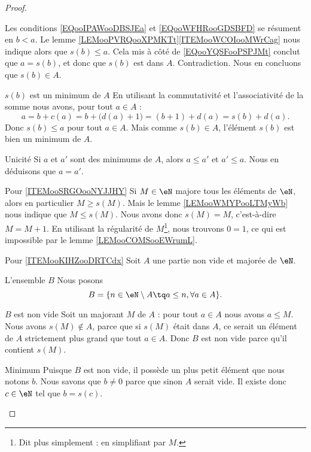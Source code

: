 \begin{proof}
\begin{subproof}
\begin{subproof}
			Les conditions \eqref{EQooIPAWooDBSJEa} et \eqref{EQooWFHRooGDSBFD} se résument en \( b<a\). Le lemme \ref{LEMooPVRQooXPMKTt}\ref{ITEMooWCOIooMWrCag} nous indique alors que \( s(b)\leq a\). Cela mis à côté de \eqref{EQooYQSFooPSPJMt} conclut que \( a=s(b)\), et donc que \( s(b)\) est dans \( A\). Contradiction. Nous en concluons que \( s(b)\in A\).
			\item[\( s(b)\) est un minimum de \( A\)]
			En utilisant la commutativité et l'associativité de la somme nous avons, pour tout \( a\in A\) :
			\begin{equation}
				a=b+c(a)=b+\big( d(a)+1 \big)=(b+1)+d(a)=s(b)+d(a).
			\end{equation}
			Donc \( s(b)\leq a\) pour tout \( a\in A\). Mais comme \( s(b)\in A\), l'élément \( s(b)\) est bien un minimum de \( A\).
			\item[Unicité]
			Si \( a\) et \( a'\) sont des minimums de \( A\), alors \( a\leq a'\) et \( a'\leq a\). Nous en déduisons que \( a=a'\).
		\end{subproof}
		\item[Pour \ref{ITEMooSRGOooNYJJHY}]
		Si \( M\in \eN\) majore tous les éléments de \( \eN\), alors en particulier \( M\geq s(M)\). Mais le lemme \ref{LEMooWMYPooLTMyWb} nous indique que \( M\leq s(M)\). Nous avons donc \( s(M)=M\), c'est-à-dire \( M=M+1\). En utilisant la régularité de \( M\)\footnote{Dit plus simplement : en simplifiant par \( M\).}, nous trouvons \( 0=1\), ce qui est impossible par le lemme \ref{LEMooCOMSooEWrumL}.
		\item[Pour \ref{ITEMooKIHZooDRTCdx}]
		Soit \( A\) une partie non vide et majorée de \( \eN\).
		\begin{subproof}
			\item[L'ensemble \( B\)]
			Nous posons
			\begin{equation}
				B=\{ n\in \eN\setminus A\tq a\leq n, \forall a \in A \}.
			\end{equation}
			\item[\( B\) est non vide]
			Soit un majorant \( M\) de \( A\) : pour tout \( a\in A\) nous avons \( a\leq M\). Nous avons \( s(M)\notin A\), parce que si \( s(M)\) était dans \( A\), ce serait un élément de \( A\) strictement plus grand que tout \( a\in A\). Donc \( B\) est non vide parce qu'il contient \( s(M)\).
		\end{subproof}
		\item[Minimum]
		Puisque \( B\) est non vide, il possède un plus petit élément que nous notons \( b\). Nous savons que \( b\neq 0\) parce que sinon \( A\) serait vide. Il existe donc \( c\in \eN\) tel que \( b=s(c)\).


\end{subproof}
\end{proof}

